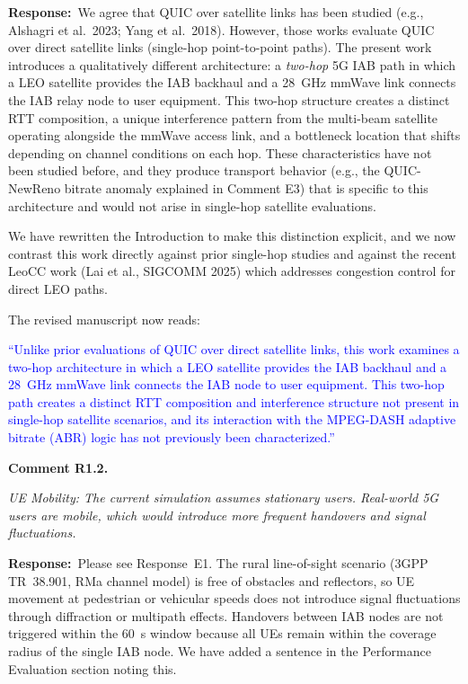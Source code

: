 \documentclass[11pt]{article}
\newcommand{\comment}[2]{\vspace{0.8em}\noindent\textbf{Comment #1.}\begin{reviewbox}\textit{#2}\end{reviewbox}}
\newcommand{\response}{\noindent\textbf{Response:}~}
\newcommand{\revised}[1]{\textcolor{blue}{``#1''}}
\begin{document}
\response We agree that QUIC over satellite links has been studied (e.g., Alshagri et al.\ 2023; Yang et al.\ 2018). However, those works evaluate QUIC over direct satellite links (single-hop point-to-point paths). The present work introduces a qualitatively different architecture: a \emph{two-hop} 5G IAB path in which a LEO satellite provides the IAB backhaul and a 28~GHz mmWave link connects the IAB relay node to user equipment. This two-hop structure creates a distinct RTT composition, a unique interference pattern from the multi-beam satellite operating alongside the mmWave access link, and a bottleneck location that shifts depending on channel conditions on each hop. These characteristics have not been studied before, and they produce transport behavior (e.g., the QUIC-NewReno bitrate anomaly explained in Comment E3) that is specific to this architecture and would not arise in single-hop satellite evaluations.

We have rewritten the Introduction to make this distinction explicit, and we now contrast this work directly against prior single-hop studies and against the recent LeoCC work (Lai et al., SIGCOMM 2025) which addresses congestion control for direct LEO paths.

The revised manuscript now reads:

\revised{Unlike prior evaluations of QUIC over direct satellite links, this work examines a two-hop architecture in which a LEO satellite provides the IAB backhaul and a 28~GHz mmWave link connects the IAB node to user equipment. This two-hop path creates a distinct RTT composition and interference structure not present in single-hop satellite scenarios, and its interaction with the MPEG-DASH adaptive bitrate (ABR) logic has not previously been characterized.}

\comment{R1.2}{UE Mobility: The current simulation assumes stationary users. Real-world 5G users are mobile, which would introduce more frequent handovers and signal fluctuations.}

\response Please see Response~E1. The rural line-of-sight scenario (3GPP TR~38.901, RMa channel model) is free of obstacles and reflectors, so UE movement at pedestrian or vehicular speeds does not introduce signal fluctuations through diffraction or multipath effects. Handovers between IAB nodes are not triggered within the 60~s window because all UEs remain within the coverage radius of the single IAB node. We have added a sentence in the Performance Evaluation section noting this.
\end{document}
